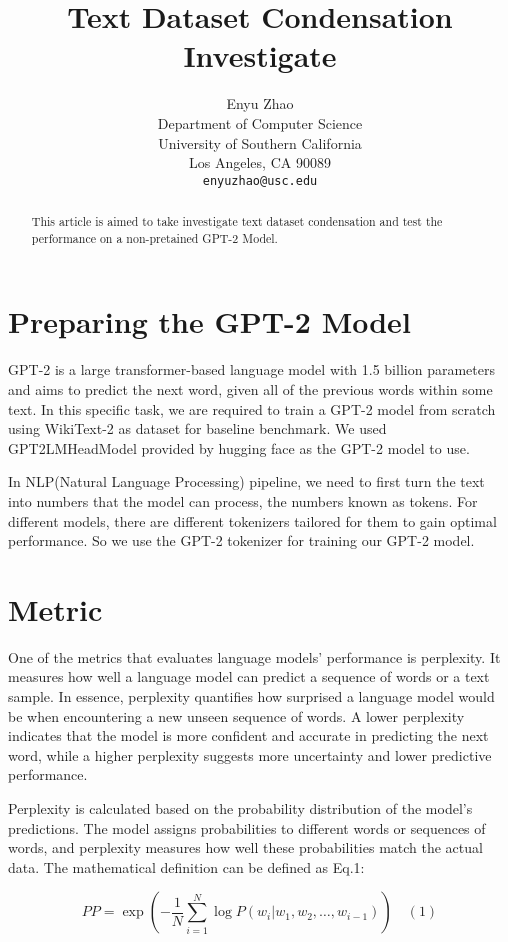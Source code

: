 \documentclass{article}
\title{Text Dataset Condensation Investigate}
\author{%
  Enyu Zhao\\
Department of Computer Science\\
University of Southern California\\
Los Angeles, CA 90089\\
\texttt{enyuzhao@usc.edu}\\
}
\begin{document}
\maketitle


\begin{abstract}
  This article is aimed to take investigate text dataset condensation and test the performance on a non-pretained GPT-2 Model. 
\end{abstract}


\section{Preparing the GPT-2 Model}
GPT-2 is a large transformer-based language model with 1.5 billion parameters and aims to  predict the next word, given all of the previous words within some text.
In this specific task, we are required to train a GPT-2 model from scratch using WikiText-2 as dataset for baseline benchmark. We used GPT2LMHeadModel provided by hugging face as the GPT-2 model to use.

In NLP(Natural Language Processing) pipeline, we need to first turn the text into numbers that the model can process, the numbers known as tokens. For different models, there are different tokenizers tailored for them to gain optimal performance. So we use the GPT-2 tokenizer for training our GPT-2 model.


\section{Metric}

One of the metrics that evaluates language models' performance is perplexity. It measures how well a language model can predict a sequence of words or a text sample. In essence, perplexity quantifies how surprised a language model would be when encountering a new unseen sequence of words. A lower perplexity indicates that the model is more confident and accurate in predicting the next word, while a higher perplexity suggests more uncertainty and lower predictive performance.

Perplexity is calculated based on the probability distribution of the model's predictions. The model assigns probabilities to different words or sequences of words, and perplexity measures how well these probabilities match the actual data. The mathematical definition can be defined as Eq.1:

$$PP = \exp\left(-\frac{1}{N} \sum_{i=1}^{N} \log P(w_i|w_1, w_2, \ldots, w_{i-1})\right)\quad (1)$$
\end{document}
